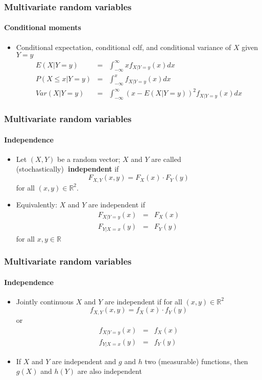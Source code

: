 \documentclass[notes=show]{beamer}
\begin{document}
\begin{frame}\frametitle{Multivariate random variables}\framesubtitle{Conditional moments}
\begin{itemize}
    \item Conditional expectation, conditional cdf, and conditional variance of $X$ given $Y=y$%
    \begin{eqnarray*}
        E\left( X|Y=y\right) &=&\int_{-\infty }^{\infty }xf_{X|Y=y}(x)dx \\
        P\left( X\leq x|Y=y\right) &=&\int_{-\infty }^{x}f_{X|Y=y}(x)dx \\
        Var\left( X|Y=y\right) &=&\int_{-\infty }^{\infty }\left( x-E(X|Y=y)\right)^{2}f_{X|Y=y}(x)dx
    \end{eqnarray*}
\end{itemize}
\end{frame}


\begin{frame}\frametitle{Multivariate random variables}\framesubtitle{Independence}
\begin{itemize}
    \item Let $\left( X,Y\right) $ be a random vector; $X$ and $Y$ are called    (stochastically)\textbf{\ independent} if
    \begin{equation*}
        F_{X,Y}(x,y)=F_{X}(x)\cdot F_{Y}(y)
    \end{equation*}
    for all $(x,y)\in \mathbb{R}^{2}$.
    \item Equivalently: $X$ and $Y$ are independent if
    \begin{eqnarray*}
        F_{X|Y=y}\left( x\right) &=&F_{X}\left( x\right) \\
        F_{Y|X=x}\left( y\right) &=&F_{Y}\left( y\right)
    \end{eqnarray*}
    for all $x,y\in \mathbb{R}$
\end{itemize}
\end{frame}


\begin{frame}\frametitle{Multivariate random variables}\framesubtitle{Independence}
\begin{itemize}
    \item Jointly continuous $X$ and $Y$ are independent if for all $(x,y)\in \mathbb{R}^{2}$
    \begin{equation*}
        f_{X,Y}(x,y)=f_{X}(x)\cdot f_{Y}(y)
    \end{equation*}
    or
    \begin{eqnarray*}
    f_{X|Y=y}\left( x\right) &=&f_{X}\left( x\right) \\
    f_{Y|X=x}\left( y\right) &=&f_{Y}\left( y\right)
    \end{eqnarray*}
    \item If $X$ and $Y$ are independent and $g$ and $h$ two (measurable) functions, then $g(X)$ and $h(Y)$ are also independent
\end{itemize}
\end{frame}
\end{document}
